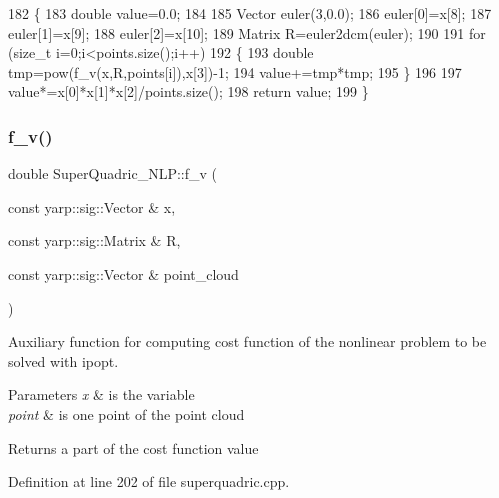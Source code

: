\begin{DoxyCode}
182  \{
183      \textcolor{keywordtype}{double} value=0.0;
184 
185      Vector euler(3,0.0);
186      euler[0]=x[8];
187      euler[1]=x[9];
188      euler[2]=x[10];
189      Matrix R=euler2dcm(euler);
190 
191      \textcolor{keywordflow}{for} (\textcolor{keywordtype}{size\_t} i=0;i<points.size();i++)
192      \{
193           \textcolor{keywordtype}{double} tmp=pow(f_v(x,R,points[i]),x[3])-1;
194           value+=tmp*tmp;
195      \}
196 
197      value*=x[0]*x[1]*x[2]/points.size();
198      \textcolor{keywordflow}{return} value;
199  \}
\end{DoxyCode}
\mbox{\label{classSuperQuadric__NLP_a36f02b201ae96896b9627851199eb49c}} 
\subsubsection{\texorpdfstring{f\+\_\+v()}{f\_v()}}
{\footnotesize\ttfamily double Super\+Quadric\+\_\+\+N\+L\+P\+::f\+\_\+v (\begin{DoxyParamCaption}\item[{const yarp\+::sig\+::\+Vector \&}]{x,  }\item[{const yarp\+::sig\+::\+Matrix \&}]{R,  }\item[{const yarp\+::sig\+::\+Vector \&}]{point\+\_\+cloud }\end{DoxyParamCaption})\hspace{0.3cm}{\ttfamily [protected]}}



Auxiliary function for computing cost function of the nonlinear problem to be solved with ipopt. 


\begin{DoxyParams}{Parameters}
{\em x} & is the variable \\
\hline
{\em point} & is one point of the point cloud \\
\hline
\end{DoxyParams}
\begin{DoxyReturn}{Returns}
a part of the cost function value 
\end{DoxyReturn}


Definition at line 202 of file superquadric.\+cpp.


